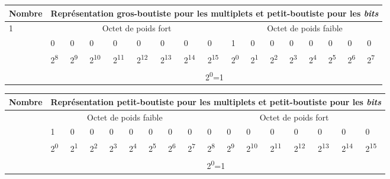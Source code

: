 \begin{table}
\centering
\begin{tabular}{|l|l|l|l|l|l|l|l|l|l|l|l|l|l|l|l|l|}\hline
\rowcolor{gris-tab-entete}\footnotesize \bf Nombre& \multicolumn{16}{l|}{\footnotesize \bf Représentation gros-boutiste pour les multiplets et petit-boutiste pour les \emph{bits}}\\
 \hline
  \multirow{4}{2cm}{1} &\multicolumn{8}{c|}{Octet de poids fort}&\multicolumn{8}{c|}{Octet de poids faible}\\
  & 0 & 0 & 0 & 0 & 0 & 0 & 0 & 0& 1 & 0 & 0 & 0 & 0 & 0 & 0 & 0 \\ 
  \cline{2-17}
    &2\textsuperscript{8}&2\textsuperscript{9}&2\textsuperscript{10}&2\textsuperscript{11}&2\textsuperscript{12}&2\textsuperscript{13}&2\textsuperscript{14}&2\textsuperscript{15}&2\textsuperscript{0}&2\textsuperscript{1}&2\textsuperscript{2}&2\textsuperscript{3}&2\textsuperscript{4}&2\textsuperscript{5}&2\textsuperscript{6}&2\textsuperscript{7}\\ 
  \cline{2-17}
    &\multicolumn{16}{c|}{2\textsuperscript{0}=1}\\ 
  \hline
  \end{tabular}
\end{table}

\begin{table}
\centering
\begin{tabular}{|l|l|l|l|l|l|l|l|l|l|l|l|l|l|l|l|l|}\hline
\rowcolor{gris-tab-entete}\footnotesize \bf Nombre& \multicolumn{16}{l|}{\footnotesize \bf Représentation petit-boutiste pour les multiplets et petit-boutiste pour les \emph{bits}}\\
 \hline
  \rowcolor{gris-clair-tab}\multirow{4}{2cm}{1} &\multicolumn{8}{c|}{Octet de poids faible}&\multicolumn{8}{c|}{Octet de poids fort}\\
  & 1 & 0 & 0 & 0 & 0 & 0 & 0 & 0& 0 & 0 & 0 & 0 & 0 & 0 & 0 & 0 \\ 
  \cline{2-17}
    &2\textsuperscript{0}&2\textsuperscript{1}&2\textsuperscript{2}&2\textsuperscript{3}&2\textsuperscript{4}&2\textsuperscript{5}&2\textsuperscript{6}&2\textsuperscript{7}&2\textsuperscript{8}&2\textsuperscript{9}&2\textsuperscript{10}&2\textsuperscript{11}&2\textsuperscript{12}&2\textsuperscript{13}&2\textsuperscript{14}&2\textsuperscript{15}\\ 
  \cline{2-17}
     \rowcolor{gris-clair-tab}&\multicolumn{16}{c|}{2\textsuperscript{0}=1}\\ 
  \hline
  \end{tabular}
\end{table}


